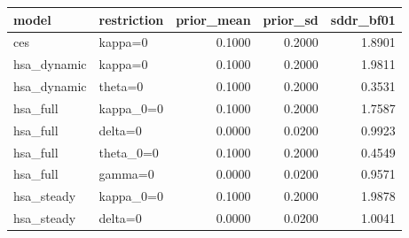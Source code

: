 \begin{tabular}{llrrr}
\toprule
model & restriction & prior\_mean & prior\_sd & sddr\_bf01 \\
\midrule
ces & kappa=0 & 0.1000 & 0.2000 & 1.8901 \\
hsa\_dynamic & kappa=0 & 0.1000 & 0.2000 & 1.9811 \\
hsa\_dynamic & theta=0 & 0.1000 & 0.2000 & 0.3531 \\
hsa\_full & kappa\_0=0 & 0.1000 & 0.2000 & 1.7587 \\
hsa\_full & delta=0 & 0.0000 & 0.0200 & 0.9923 \\
hsa\_full & theta\_0=0 & 0.1000 & 0.2000 & 0.4549 \\
hsa\_full & gamma=0 & 0.0000 & 0.0200 & 0.9571 \\
hsa\_steady & kappa\_0=0 & 0.1000 & 0.2000 & 1.9878 \\
hsa\_steady & delta=0 & 0.0000 & 0.0200 & 1.0041 \\
\bottomrule
\end{tabular}
